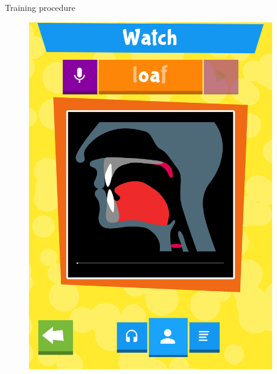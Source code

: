 \documentclass[final,xcolor={cmyk,hyperref}]{beamer}
\begin{document}
\begin{frame}[t]
\begin{columns}[t]
\begin{column}{0.45\linewidth}
\begin{block}{Training procedure}
\begin{figure}[h]
\begin{columns}
\begin{column}{\screenshotwidth}
    \includegraphics[width=\linewidth]{images/CALVin-screenshots/jpgs/vocal_tract_animation}
  \end{column}
  \begin{column}{\screenshotwidth}

\end{column}
\end{columns}
\end{figure}
\end{block}
\end{column}
\end{columns}
\end{frame}
\end{document}
